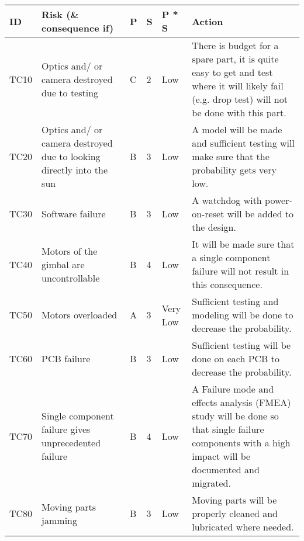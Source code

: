 

\begin{longtable}{|m{}| m{} |m{} |m{}|m{}| m{}|}

\hline
\textbf{ID} & \textbf{Risk (\& consequence if)} & \textbf{P} & \textbf{S} & \textbf{P * S} & \textbf{Action} \\ \hline


TC10 & Optics and/ or camera destroyed due to testing						& C & 2 & \cellcolor[HTML]{FCFF2F}Low 		& There is budget for a spare part, it is quite easy to get and test where it will likely fail (e.g. drop test) will not be done with this part.\\\hline

TC20 & Optics and/ or camera destroyed due to looking directly into the sun & B & 3 & \cellcolor[HTML]{FCFF2F}Low 		& A model will be made and sufficient testing will make sure that the probability gets very low.\\\hline

TC30 & Software failure														& B & 3 & \cellcolor[HTML]{FCFF2F}Low 		& A watchdog with power-on-reset will be added to the design.\\\hline

TC40 & Motors of the gimbal are uncontrollable								& B & 4 & \cellcolor[HTML]{FCFF2F}Low 		& It will be made sure that a single component failure will not result in this consequence.\\\hline

TC50 & Motors overloaded													& A & 3 & \cellcolor[HTML]{34FF34}Very Low 	& Sufficient testing and modeling will be done to decrease the probability.\\\hline

TC60 & PCB failure															& B & 3 & \cellcolor[HTML]{FCFF2F}Low 		& Sufficient testing will be done on each PCB to decrease the probability.\\\hline

TC70 & Single component failure gives unprecedented failure					& B & 4 & \cellcolor[HTML]{FCFF2F}Low			& A Failure mode and effects analysis (FMEA) study will be done so that single failure components with a high impact will be documented and migrated.\\\hline

TC80& Moving parts jamming & B & 3 & \cellcolor[HTML]{FCFF2F} Low & Moving parts will be properly cleaned and lubricated where needed. \\\hline


\end{longtable}
